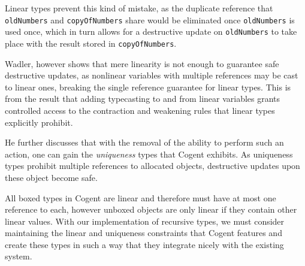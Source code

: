 Linear types prevent this kind of mistake, as the duplicate reference that
\verb|oldNumbers| and \verb|copyOfNumbers| share would be eliminated once \verb|oldNumbers| is used once,
which in turn allows for a destructive update on \verb|oldNumbers| to take place with the result stored in
\verb|copyOfNumbers|.

Wadler, however shows that mere linearity is not enough to guarantee safe destructive updates, as nonlinear
variables with multiple references may be cast to linear ones, breaking the single reference guarantee
for linear types. This is from the result that adding typecasting to and from linear variables grants 
controlled access to the contraction and weakening rules that linear types explicitly prohibit.

He further discusses that with the removal of the ability to perform such an action,
one can gain the \textit{uniqueness} types that Cogent exhibits. 
As uniqueness types prohibit multiple references to allocated objects, 
destructive updates upon these object become safe.

All boxed types in Cogent are linear and therefore must have at most one reference to each,
however unboxed objects are only linear if they contain other linear values.
With our implementation of recursive types, we must consider maintaining the linear and uniqueness constraints
that Cogent features and create these types in such a way that they integrate nicely with the existing
system.
